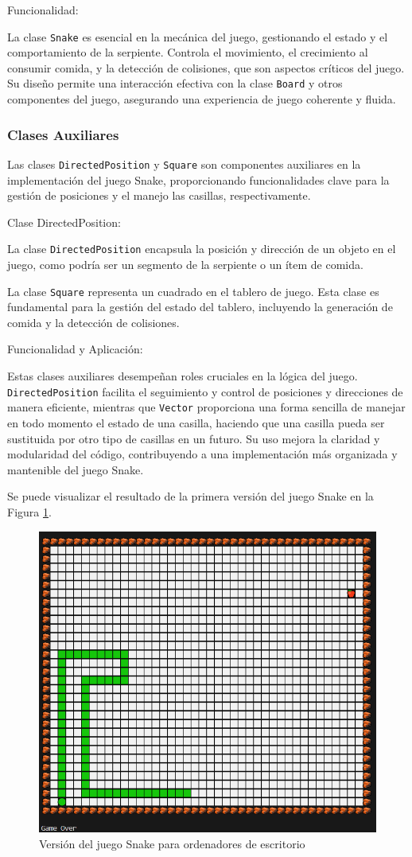 Funcionalidad:

La clase \texttt{Snake} es esencial en la mecánica del juego, gestionando el estado y el comportamiento de la serpiente. Controla el movimiento, el crecimiento al consumir comida, y la detección de colisiones, que son aspectos críticos del juego. Su diseño permite una interacción efectiva con la clase \texttt{Board} y otros componentes del juego, asegurando una experiencia de juego coherente y fluida.

\subsubsection{Clases Auxiliares}

Las clases \texttt{DirectedPosition} y \texttt{Square} son componentes auxiliares en la implementación del juego Snake, proporcionando funcionalidades clave para la gestión de posiciones y el manejo las casillas, respectivamente.

Clase DirectedPosition:

La clase \texttt{DirectedPosition} encapsula la posición y dirección de un objeto en el juego, como podría ser un segmento de la serpiente o un ítem de comida.

La clase \texttt{Square} representa un cuadrado en el tablero de juego. Esta clase es fundamental para la gestión del estado del tablero, incluyendo la generación de comida y la detección de colisiones.


Funcionalidad y Aplicación:

Estas clases auxiliares desempeñan roles cruciales en la lógica del juego. \texttt{DirectedPosition} facilita el seguimiento y control de posiciones y direcciones de manera eficiente, mientras que \texttt{Vector} proporciona una forma sencilla de manejar en todo momento el estado de una casilla, haciendo que una casilla pueda ser sustituida por otro tipo de casillas en un futuro. Su uso mejora la claridad y modularidad del código, contribuyendo a una implementación más organizada y mantenible del juego Snake.

Se puede visualizar el resultado de la primera versión del juego Snake en la Figura \ref{figure:snakeV1}.

\begin{figure}[!htb]
   \centering
    \includegraphics[width=0.6\linewidth]{figures/snakeV1.png}
   \caption{Versión del juego Snake para ordenadores de escritorio}
   \label{figure:snakeV1}
\end{figure}
